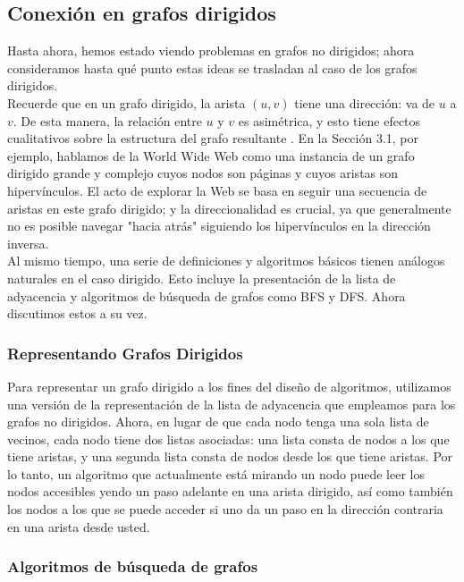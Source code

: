 \documentclass[a4paper, 12pt]{book}
\begin{document}
\subsection{Conexión en grafos dirigidos}

Hasta ahora, hemos estado viendo problemas en grafos no dirigidos; ahora consideramos hasta qué punto estas ideas se trasladan al caso de los grafos dirigidos.\\

Recuerde que en un grafo dirigido, la arista $(u, v)$ tiene una dirección: va de $u$ a $v$. De esta manera, la relación entre $u$ y $v$ es asimétrica, y esto tiene efectos cualitativos sobre la estructura del grafo resultante . En la Sección 3.1, por ejemplo, hablamos de la World Wide Web como una instancia de un grafo dirigido grande y complejo cuyos nodos son páginas y cuyos aristas son hipervínculos. El acto de explorar la Web se basa en seguir una secuencia de aristas en este grafo dirigido; y la direccionalidad es crucial, ya que generalmente no es posible navegar "hacia atrás" siguiendo los hipervínculos en la dirección inversa.\\

Al mismo tiempo, una serie de definiciones y algoritmos básicos tienen análogos naturales en el caso dirigido. Esto incluye la presentación de la lista de adyacencia y algoritmos de búsqueda de grafos como BFS y DFS. Ahora discutimos estos a su vez.\\

\subsubsection*{Representando Grafos Dirigidos}

Para representar un grafo dirigido a los fines del diseño de algoritmos, utilizamos una versión de la representación de la lista de adyacencia que empleamos para los grafos no dirigidos. Ahora, en lugar de que cada nodo tenga una sola lista de vecinos, cada nodo tiene dos listas asociadas: una lista consta de nodos a los que tiene aristas, y una segunda lista consta de nodos desde los que tiene aristas. Por lo tanto, un algoritmo que actualmente está mirando un nodo puede leer los nodos accesibles yendo un paso adelante en una arista dirigido, así como también los nodos a los que se puede acceder si uno da un paso en la dirección contraria en una arista desde usted.\\

\subsubsection*{Algoritmos de búsqueda de grafos}
\end{document}
